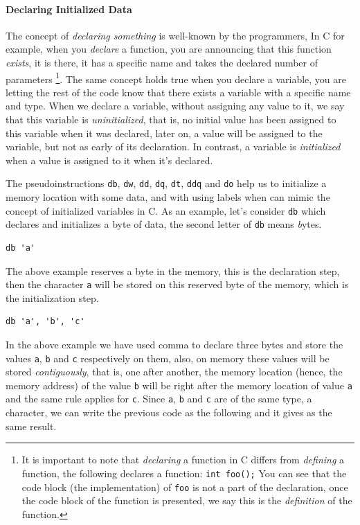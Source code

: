 \paragraph{Declaring Initialized Data}\label{declaring-initialized-data}

The concept of \emph{declaring something} is well-known by the
programmers, In C for example, when you \emph{declare} a function, you
are announcing that this function \emph{exists}, it is there, it has a
specific name and takes the declared number of parameters \footnote{It
  is important to note that \emph{declaring} a function in C differs
  from \emph{defining} a function, the following declares a function:
  \lstinline!int foo();! You can see that the code block (the
  implementation) of \lstinline!foo! is not a part of the declaration,
  once the code block of the function is presented, we say this is the
  \emph{definition} of the function.}. The same concept holds true when
you declare a variable, you are letting the rest of the code know that
there exists a variable with a specific name and type. When we declare a
variable, without assigning any value to it, we say that this variable
is \emph{uninitialized}, that is, no initial value has been assigned to
this variable when it was declared, later on, a value will be assigned
to the variable, but not as early of its declaration. In contrast, a
variable is \emph{initialized} when a value is assigned to it when it's
declared.

The pseudoinstructions \lstinline!db!, \lstinline!dw!, \lstinline!dd!,
\lstinline!dq!, \lstinline!dt!, \lstinline!ddq! and \lstinline!do! help
us to initialize a memory location with some data, and with using labels
when can mimic the concept of initialized variables in C. As an example,
let's consider \lstinline!db! which declares and initializes a byte of
data, the second letter of \lstinline!db! means \emph{b}ytes.

\begin{lstlisting}
db 'a'
\end{lstlisting}

The above example reserves a byte in the memory, this is the declaration
step, then the character \lstinline!a! will be stored on this reserved
byte of the memory, which is the initialization step.

\begin{lstlisting}
db 'a', 'b', 'c'
\end{lstlisting}

In the above example we have used comma to declare three bytes and store
the values \lstinline!a!, \lstinline!b! and \lstinline!c! respectively
on them, also, on memory these values will be stored
\emph{contiguously}, that is, one after another, the memory location
(hence, the memory address) of the value \lstinline!b! will be right
after the memory location of value \lstinline!a! and the same rule
applies for \lstinline!c!. Since \lstinline!a!, \lstinline!b! and
\lstinline!c! are of the same type, a character, we can write the
previous code as the following and it gives as the same result.

